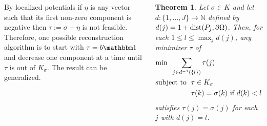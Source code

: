 \documentclass[a0paper, portrait]{tikzposter}
\renewcommand{\leq}{\leqslant}
\newtheorem*{thm}{Theorem}
\begin{document}
\begin{columns}
{
By localized potentials if $\eta$ is any vector such that its first non-zero component is negative then $\tau := \sigma + \eta$ is not feasible.
Therefore, one possible reconstruction algorithm is to start with $\tau = b\mathbbm1$ and decrease one component at a time until $\tau$ is out of $K_\sigma$.
The result can be generalized.\\[1em]
\begin{minipage}{0.7\linewidth}
\begin{thm}
Let $\sigma\in K$ and let $d:\{1,\dots,J\}\to\mathbb N$ defined by $d(j)=1+\textup{dist}(P_j,\partial \Omega)$.
Then, for each $1\leq l \leq \max_j d(j)$, any minimizer $\tau$ of
\begin{align*}
&\textup{min}\;\; \sum_{j\in d^{-1}\left(\{l\}\right)}\tau(j) \\
&\textup{subject to }\; \tau \in K_\sigma \\
&\phantom{\textup{subject to }\;} \tau(k) = \sigma(k) \textup{ if } d(k) < l
\end{align*}
satisfies $\tau(j)=\sigma(j)$ for each $j$ with $d(j)=l$.
\end{thm}
\end{minipage}
\begin{minipage}{0.3\linewidth}
\centering
{}
\end{minipage}
}


\end{columns}
\end{document}
